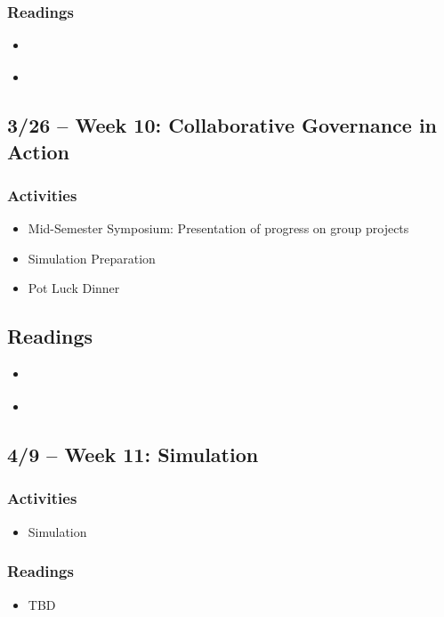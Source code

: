 \documentclass[12pt, letterpaper]{article}
\begin{document}
    \subsubsection*{Readings}
        \begin{itemize}
            \item \citet[chapter 4--5]{Agranoff2012}
            \item \citet[chapter 4--6]{Henderson2015}
        \end{itemize}

\subsection*{3/26 -- Week 10: Collaborative Governance in Action}
    \subsubsection*{Activities}
        \begin{itemize}
            \item Mid-Semester Symposium: Presentation of progress on group projects
            \item Simulation Preparation
            \item Pot Luck Dinner
        \end{itemize}
    \subsection*{Readings}
        \begin{itemize}
            \item \citet[chapter 5]{Agranoff2023}
            \item \citet[chapter 7]{Henderson2015}
        \end{itemize}


\subsection*{4/9 -- Week 11: Simulation}
    \subsubsection*{Activities}
        \begin{itemize}
            \item Simulation
        \end{itemize}
    \subsubsection*{Readings}
        \begin{itemize}
            \item TBD
        \end{itemize}
\end{document}
